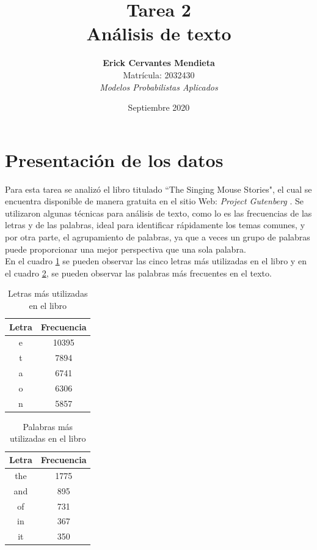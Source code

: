 \documentclass[spanish,notitlepage,letterpaper, 12pt]{article} %
\begin{document}
\title{Tarea 2 \\ Análisis de texto}

\author{
\textbf{Erick Cervantes Mendieta} \\
\vspace{0.5cm}
\textnormal{Matrícula: 2032430}\\
\textit{Modelos Probabilistas Aplicados}}
\date{Septiembre 2020}

\maketitle


\section{Presentación de los datos}

Para esta tarea se analizó el libro titulado ``The Singing Mouse Stories", el cual se encuentra disponible de manera gratuita en el sitio Web: \emph{Project Gutenberg} \cite{Mouse}. Se utilizaron algunas técnicas para análisis de texto, como lo es las frecuencias de las letras y de las palabras, ideal para identificar rápidamente los temas comunes, y por otra parte, el agrupamiento de palabras, ya que a veces un grupo de palabras puede proporcionar una mejor perspectiva que una sola palabra.\\

En el cuadro \ref{t1} se pueden observar las cinco letras más utilizadas en el libro y en el cuadro \ref{t2}, se pueden observar las palabras más frecuentes en el texto.

\begin{table}[]
\centering
\caption{Letras más utilizadas en el libro}
\vspace{0.3 cm}
\begin{tabular}{c|c}
 Letra & Frecuencia \\
 \hline
  e & 10395 \\
  t & 7894 \\
  a & 6741 \\
  o & 6306 \\
  n & 5857 \\
\end{tabular}
\label{t1}
\end{table}

\begin{table}[]
\centering
\caption{Palabras más utilizadas en el libro}
\vspace{0.3 cm}
\begin{tabular}{c|c}
 Letra & Frecuencia \\
 \hline
  the & 1775 \\
  and & 895 \\
  of & 731 \\
  in & 367 \\
  it & 350 \\
\end{tabular}
\label{t2}
\end{table}
\end{document}
